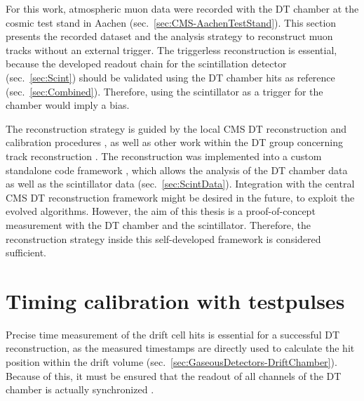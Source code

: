 \label{sec:DTData}

For this work, atmospheric muon data were recorded with the \ac{DT} chamber at the cosmic test stand in Aachen (sec.\ \ref{sec:CMS-AachenTestStand}). This section presents the recorded dataset and the analysis strategy to reconstruct muon tracks without an external trigger. The triggerless reconstruction is essential, because the developed readout chain for the scintillation detector (sec.\ \ref{sec:Scint}) should be validated using the \ac{DT} chamber hits as reference (sec.\ \ref{sec:Combined}). Therefore, using the scintillator as a trigger for the chamber would imply a bias.
\par The reconstruction strategy is guided by the local \ac{CMS} \ac{DT} reconstruction \cite{DT-LocalReco} and calibration procedures \cite{DT-OfflineCalibration}, as well as other work within the \ac{DT} group concerning track reconstruction \cite{MSc-Alcalde,CMS-NOTE-2008-017}. The reconstruction was implemented into a custom standalone code framework \cite{dt-scint-analysis-tools-Main}, which allows the analysis of the \ac{DT} chamber data as well as the scintillator data (sec.\ \ref{sec:ScintData}). Integration with the central \ac{CMS} \ac{DT} reconstruction framework might be desired in the future, to exploit the evolved algorithms. However, the aim of this thesis is a proof-of-concept measurement with the \ac{DT} chamber and the scintillator. Therefore, the reconstruction strategy inside this self-developed framework is considered sufficient.




\FloatBarrier
\section{Timing calibration with testpulses}
\label{sec:DTData-Testpulse}
Precise time measurement of the drift cell hits is essential for a successful \ac{DT} reconstruction, as the measured timestamps are directly used to calculate the hit position within the drift volume (sec.\ \ref{sec:GaseousDetectors-DriftChamber}). Because of this, it must be ensured that the readout of all channels of the \ac{DT} chamber is actually synchronized \cite{DT-OfflineCalibration}. 

